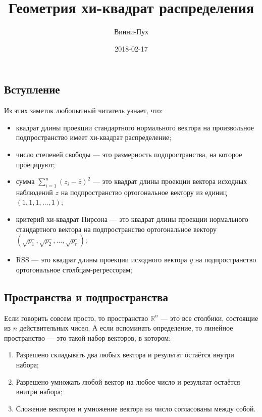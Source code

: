 \documentclass[11pt,russian,]{article}
\title{Геометрия хи-квадрат распределения}
\author{Винни-Пух}
\date{2018-02-17}
\providecommand{\tightlist}{%
  \setlength{\itemsep}{0pt}\setlength{\parskip}{0pt}}
\newcommand{\RR}{\mathbb{R}}
\renewcommand{\Rn}{\RR^n}
\newcommand{\1}{\mathbbm{1}}
\begin{document}
\maketitle

{
\setcounter{tocdepth}{2}
\tableofcontents
}
\subsection{Вступление}

Из этих заметок любопытный читатель узнает, что:

\begin{itemize}
\item
  квадрат длины проекции стандартного нормального вектора на
  произвольное подпространство имеет хи-квадрат распределение;
\item
  число степеней свободы --- это размерность подпространства, на которое
  проецируют;
\item
  сумма \(\sum_{i=1}^n (z_i - \bar z)^2\) --- это квадрат длины проекции
  вектора исходных наблюдений \(z\) на подпространство ортогональное
  вектору из единиц \((1, 1, 1, \ldots, 1)\);
\item
  критерий хи-квадрат Пирсона --- это квадрат длины проекции нормального
  стандартного вектора на подпространство ортогональное вектору
  \((\sqrt{p_1}, \sqrt{p_2}, \ldots, \sqrt{p_r})\);
\item
  RSS --- это квадрат длины проекции исходного вектора \(y\) на
  подпространство ортогональное столбцам-регрессорам;
\end{itemize}

\subsection{Пространства и подпространства}\label{--}

Если говорить совсем просто, то пространство \(\Rn\) --- это все
столбики, состоящие из \(n\) действительных чисел. А если вспоминать
определение, то линейное пространство --- это такой набор векторов, в
котором:

\begin{enumerate}
\def\labelenumi{\arabic{enumi}.}
\tightlist
\item
  Разрешено складывать два любых вектора и результат остаётся внутри
  набора;
\item
  Разрешено умножать любой вектор на любое число и результат остаётся
  внитри набора;
\item
  Сложение векторов и умножение вектора на число согласованы между
  собой.
\end{enumerate}
\end{document}
